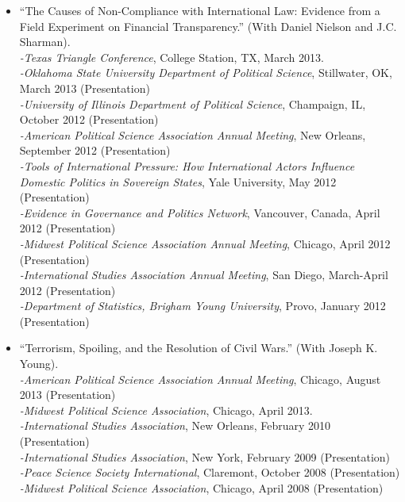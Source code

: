 \documentclass[10pt]{article}
\begin{document}
\begin{itemize}
\item ``The Causes of Non-Compliance with International Law: Evidence from a Field Experiment on Financial Transparency.'' (With Daniel Nielson and J.C. Sharman). 
	\\ \indent \textit{-Texas Triangle Conference}, College Station, TX, March 2013.
	\\ \indent \textit{-Oklahoma State University Department of Political Science}, Stillwater, OK, March 2013 (Presentation)
	\\ \indent \textit{-University of Illinois Department of Political Science}, Champaign, IL, October 2012 (Presentation)
	\\ \indent \textit{-American Political Science Association Annual Meeting}, New Orleans, September 2012 (Presentation)
	\\ \indent \textit{-Tools of International Pressure: How International Actors Influence Domestic Politics in Sovereign States}, Yale University, May 2012 (Presentation)
	\\ \indent \textit{-Evidence in Governance and Politics Network}, Vancouver, Canada, April 2012 (Presentation)
	\\ \indent \textit{-Midwest Political Science Association Annual Meeting}, Chicago, April 2012 (Presentation)
	\\ \indent \textit{-International Studies Association Annual Meeting}, San Diego, March-April 2012 (Presentation)
	\\ \indent \textit{-Department of Statistics, Brigham Young University}, Provo, January 2012 (Presentation)
	
\item ``Terrorism, Spoiling, and the Resolution of Civil Wars.'' (With Joseph K. Young).
	\\ \indent \textit{-American Political Science Association Annual Meeting}, Chicago, August 2013 (Presentation)
	\\ \indent \textit{-Midwest Political Science Association}, Chicago, April 2013.	
	\\ \indent \textit{-International Studies Association}, New Orleans, February 2010 (Presentation)
	\\ \indent \textit{-International Studies Association}, New York, February 2009 (Presentation)
	\\ \indent \textit{-Peace Science Society International}, Claremont, October 2008 (Presentation)
	\\ \indent \textit{-Midwest Political Science Association}, Chicago, April 2008 (Presentation)



\end{itemize}
\end{document}
